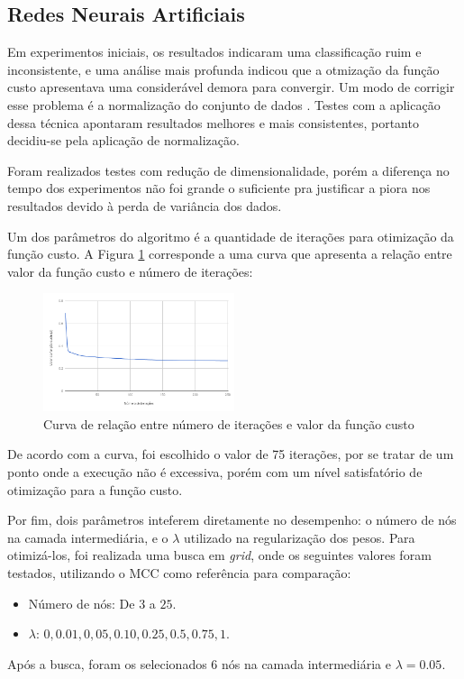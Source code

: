 \subsection{Redes Neurais Artificiais}

Em experimentos iniciais, os resultados indicaram uma classificação ruim e inconsistente, e uma análise mais profunda indicou que a otmização da função custo apresentava uma considerável demora para convergir. Um modo de corrigir esse problema é a normalização do conjunto de dados \cite{backprop}. Testes com a aplicação dessa técnica apontaram resultados melhores e mais consistentes, portanto decidiu-se pela aplicação de normalização.

Foram realizados testes com redução de dimensionalidade, porém a diferença no tempo dos experimentos não foi grande o suficiente pra justificar a piora nos resultados devido à perda de variância dos dados.

Um dos parâmetros do algoritmo é a quantidade de iterações para otimização da função custo. A Figura \ref{fig:grafico_nn} corresponde a uma curva que apresenta a relação entre valor da função custo e número de iterações:

\begin{figure}[ht]
  \centering
    \includegraphics[width=0.5\textwidth]{chart.png}
    \caption{Curva de relação entre número de iterações e valor da função custo}
    \label{fig:grafico_nn}
\end{figure}


De acordo com a curva, foi escolhido o valor de 75 iterações, por se tratar de um ponto onde a execução não é excessiva, porém com um nível satisfatório de otimização para a função custo.

Por fim, dois parâmetros inteferem diretamente no desempenho: o número de nós na camada intermediária, e o $\lambda$ utilizado na regularização dos pesos. Para otimizá-los, foi realizada uma busca em \emph{grid}, onde os seguintes valores foram testados, utilizando o MCC como referência para comparação:

\begin{itemize}
\item Número de nós: De $3$ a $25$.
\item $\lambda$: $0, 0.01, 0,05, 0.10, 0.25, 0.5, 0.75, 1$.
\end{itemize}

Após a busca, foram os selecionados 6 nós na camada intermediária e $\lambda = 0.05$. 
